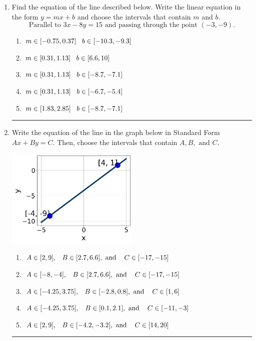 \documentclass[14pt]{extbook}
\newcommand{\litem}[1]{\item#1\hspace*{-1cm}\rule{\textwidth}{0.4pt}}
\begin{document}
\begin{enumerate}
{\begin{enumerate}[label=\Alph*.]
\end{enumerate} }
\litem{
Find the equation of the line described below. Write the linear equation in the form $ y=mx+b $ and choose the intervals that contain $m$ and $b$.\[ \text{Parallel to } 3 x - 8 y = 15 \text{ and passing through the point } (-3, -9). \]\begin{enumerate}[label=\Alph*.]
\item \( m \in [-0.75, 0.37] \hspace*{3mm} b \in [-10.3, -9.3] \)
\item \( m \in [0.31, 1.13] \hspace*{3mm} b \in [6.6, 10] \)
\item \( m \in [0.31, 1.13] \hspace*{3mm} b \in [-8.7, -7.1] \)
\item \( m \in [0.31, 1.13] \hspace*{3mm} b \in [-6.7, -5.4] \)
\item \( m \in [1.83, 2.85] \hspace*{3mm} b \in [-8.7, -7.1] \)

\end{enumerate} }
\litem{
Write the equation of the line in the graph below in Standard Form $Ax+By=C$. Then, choose the intervals that contain $A, B, \text{ and } C$.
\begin{center}
    \includegraphics[width=0.5\textwidth]{../Figures/linearGraphToStandardCopyA.png}
\end{center}
\begin{enumerate}[label=\Alph*.]
\item \( A \in [2, 9], \hspace{3mm} B \in [2.7, 6.6], \text{ and } \hspace{3mm} C \in [-17, -15] \)
\item \( A \in [-8, -4], \hspace{3mm} B \in [2.7, 6.6], \text{ and } \hspace{3mm} C \in [-17, -15] \)
\item \( A \in [-4.25, 3.75], \hspace{3mm} B \in [-2.8, 0.8], \text{ and } \hspace{3mm} C \in [1, 6] \)
\item \( A \in [-4.25, 3.75], \hspace{3mm} B \in [0.1, 2.1], \text{ and } \hspace{3mm} C \in [-11, -3] \)
\item \( A \in [2, 9], \hspace{3mm} B \in [-4.2, -3.2], \text{ and } \hspace{3mm} C \in [14, 20] \)


\end{enumerate}}
\end{enumerate}
\end{document}
